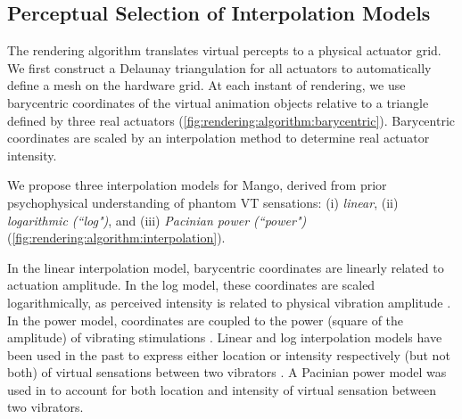 \subsection{Perceptual Selection of Interpolation Models}
The rendering algorithm translates virtual percepts to a physical actuator grid.
We first construct a Delaunay triangulation for all actuators to automatically define a mesh on the hardware grid.
At each instant of rendering, we use barycentric coordinates of the virtual animation objects relative to a triangle defined by three real actuators (\autoref{fig:rendering:algorithm:barycentric}).
Barycentric coordinates are scaled by an interpolation method to determine real actuator intensity.

We propose three interpolation models for Mango, derived from prior psychophysical understanding of phantom VT sensations:
(i) {\it linear}, 
(ii) {\it logarithmic (``log")}, and 
(iii) {\it Pacinian power (``power")} (\autoref{fig:rendering:algorithm:interpolation}). 

In the linear interpolation model, barycentric coordinates are linearly related to actuation amplitude. In the log model, these coordinates are scaled logarithmically, as perceived intensity is related to physical vibration amplitude %
\cite{verrillo1992perception}. In the power model,  coordinates are coupled to the power (square of the amplitude) of vibrating stimulations \cite{verrillo1992perception}. 
Linear and log interpolation models have been used in the past to express either location or intensity respectively (but not both) of virtual sensations between two vibrators \cite{Seo2013,Alles1970}. A Pacinian power model was used in \cite{Israr2011a} to account for both location and intensity of virtual sensation between two vibrators.


